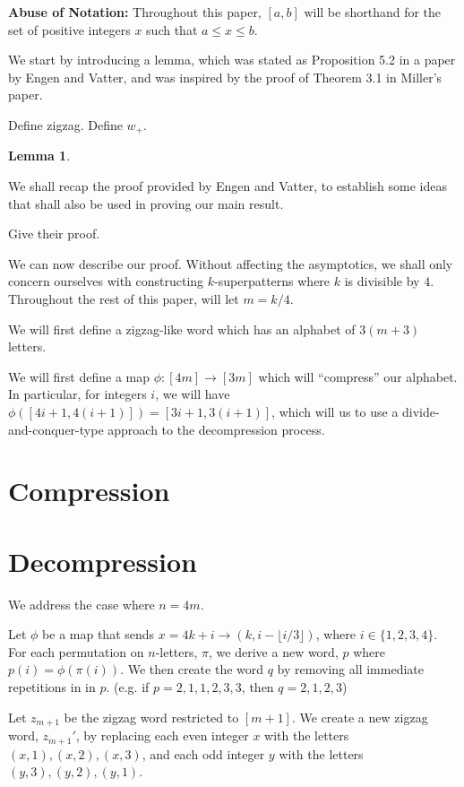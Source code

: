 \documentclass{article}
\newtheorem{lem}{Lemma}
\begin{document}
\textbf{Abuse of Notation:} Throughout this paper, $[a,b]$ will be shorthand for the set of positive integers $x$ such that $a \le x \le b$.

We start by introducing a lemma, which was stated as Proposition 5.2 in a paper by Engen and Vatter, and was inspired by the proof of Theorem 3.1 in Miller's paper.

Define zigzag. Define $w_+$.

\begin{lem}

\end{lem}

We shall recap the proof provided by Engen and Vatter, to establish some ideas that shall also be used in proving our main result.

Give their proof.

We can now describe our proof. Without affecting the asymptotics, we shall only concern ourselves with constructing $k$-superpatterns where $k$ is divisible by $4$. Throughout the rest of this paper, will let $m = k/4$.

We will first define a zigzag-like word which has an alphabet of $3(m+3)$ letters.

We will first define a map $\phi:[4m]\to [3m]$ which will ``compress'' our alphabet. In particular, for integers $i$, we will have $\phi([4i+1,4(i+1)]) =[3i+1,3(i+1)]$, which will us to use a divide-and-conquer-type approach to the decompression process.

\section{Compression}



\section{Decompression}

We address the case where $n = 4m$.

Let $\phi$ be a map that sends $x = 4k+i \to (k,i-\lfloor i/3\rfloor)$, where $i \in \{1,2,3,4\}$. For each permutation on $n$-letters, $\pi$, we derive a new word, $p$ where $p(i) = \phi(\pi(i))$. We then create the word $q$ by removing all immediate repetitions in in $p$. (e.g. if $p = 2,1,1,2,3,3$, then $q = 2,1,2,3$)

Let $z_{m+1}$ be the zigzag word restricted to $[m+1]$. We create a new zigzag word, $z_{m+1}'$, by replacing each even integer $x$ with the letters $(x,1),(x,2),(x,3)$, and each odd integer $y$ with the letters $(y,3),(y,2),(y,1)$.
\end{document}
